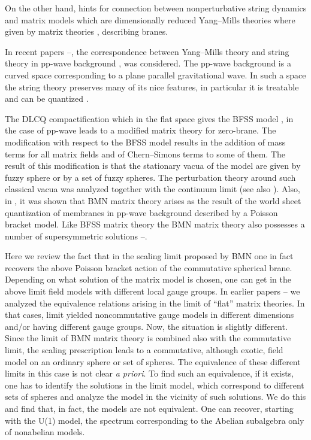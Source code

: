 \documentclass[a4paper]{article}
\begin{document}
On the other hand, hints for connection between nonperturbative
string dynamics and matrix models which are dimensionally reduced
Yang--Mills theories where given by matrix theories
\cite{Banks:1997vh,Ishibashi:1997xs}, describing branes.

In recent papers
\cite{Berenstein:2002jq}\nocite{Berenstein:2002zw}--\cite{Berenstein:2002sa},
the correspondence between Yang--Mills theory and string theory in
pp-wave background \cite{Blau:2002dy,Blau:2002mw}, was considered.
The pp-wave background is a curved space corresponding to a plane
parallel gravitational wave. In such a space the string theory
preserves many of its nice features, in particular it is treatable
and can be quantized \cite{Metsaev:2001bj}.

The DLCQ compactification which in the flat space gives the BFSS
model \cite{Banks:1997vh}, in the case of pp-wave leads to a
modified matrix theory for zero-brane. The modification with
respect to the BFSS model results in the addition of mass terms
for all matrix fields and of Chern--Simons terms to some of them.
The result of this modification is that the stationary vacua of
the model are given by fuzzy sphere or by a set of fuzzy spheres.
The perturbation theory around such classical vacua was analyzed
\cite{Dasgupta:2002hx} together with the continuum limit (see also
\cite{Valtancoli:2002rx}). Also, in \cite{Dasgupta:2002hx}, it was
shown that BMN matrix theory arises as the result of the world
sheet quantization of membranes in pp-wave background described by
a Poisson bracket model. Like BFSS matrix theory the BMN matrix
theory also possesses a number of supersymmetric solutions
\cite{Bak:2002rq}--\nocite{Bak:2002aq,Sugiyama:2002jq}\cite{Sugiyama:2002rs}.

Here we review the fact that in the scaling limit proposed by BMN
one in fact recovers the above Poisson bracket action of the
commutative spherical brane. Depending on what solution of the
matrix model is chosen, one can get in the above limit field
models with different local gauge groups. In earlier papers
\cite{Sochichiu:2000ud}\nocite{Sochichiu:2000bg,Sochichiu:2000kz,%
Kiritsis:2002py}--\cite{Sochichiu:2002jh} we analyzed the
equivalence relations arising in the \coordHE{} limit of
``flat'' matrix theories. In that cases, \coordHE{} limit
yielded noncommutative gauge models in different dimensions and/or
having different gauge groups. Now, the situation is slightly
different. Since the \coordHE{} limit of BMN matrix theory is
combined also with the commutative limit, the scaling prescription
leads to a commutative, although exotic, field model on an
ordinary sphere or set of spheres. The equivalence of these
different limits in this case is not clear \emph{a priori}. To
find such an equivalence, if it exists, one has to identify the
solutions in the limit model, which correspond to different sets
of spheres and analyze the model in the vicinity of such
solutions. We do this and find that, in fact, the models are not
equivalent. One can recover, starting with the U(1) model, the
spectrum corresponding to the Abelian subalgebra only of
nonabelian models.
\end{document}
